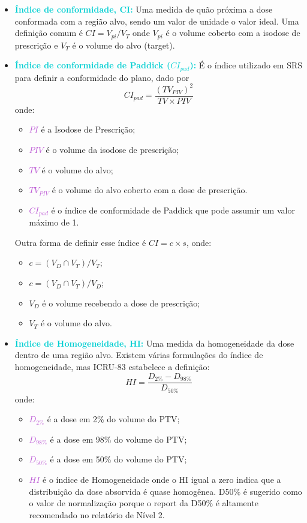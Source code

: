 \documentclass[11pt,a4paper]{article}
\begin{document}
	\begin{itemize}[label=\textcolor{CarnationPink}{$\blacktriangleright$}]
		\item \textcolor{DarkTurquoise}{\textbf{Índice de conformidade, CI:}} Uma medida de quão próxima a dose conformada com a região alvo, sendo um valor de unidade o valor ideal. Uma definição comum é $CI = V_{pi}/V_{T}$ onde $V_{pi}$ é o volume coberto com a isodose de prescrição e $V_{T}$ é o volume do alvo (target).
		\item \textcolor{DarkTurquoise}{\textbf{Índice de conformidade de Paddick ($CI_{pad}$):}} É o índice utilizado em SRS para definir a conformidade do plano, dado por $$CI_{pad} = \frac{(TV_{PIV})^2}{TV \times PIV}$$ onde:
			\begin{itemize}[label=\textcolor{CarnationPink}{$\star$}]
				\item \textcolor{MediumOrchid}{$PI$} é a Isodose de Prescrição;
				\item \textcolor{MediumOrchid}{$PIV$} é o volume da isodose de prescrição;
				\item \textcolor{MediumOrchid}{$TV$} é o volume do alvo;
				\item \textcolor{MediumOrchid}{$TV_{PIV}$} é o volume do alvo coberto com a dose de prescrição.
				\item \textcolor{MediumOrchid}{$CI_{pad}$} é o índice de conformidade de Paddick que pode assumir um valor máximo de 1. 
			\end{itemize}
		
		Outra forma de definir esse índice é $CI = c \times s$, onde:
			\begin{itemize}[label=\textcolor{CarnationPink}{$\star$}]
				\item $c = (V_D \cap V_T) / V_T$;
				\item $c = (V_D \cap V_T) / V_D$;
				\item $V_D$ é o volume recebendo a dose de prescrição;
				\item $V_T$ é o volume do alvo.
			\end{itemize}

		\item \textcolor{DarkTurquoise}{\textbf{Índice de Homogeneidade, HI:}} Uma medida da homogeneidade da dose dentro de uma região alvo. Existem várias formulações do índice de homogeneidade, mas ICRU-83 estabelece a definição: $$HI = \frac{D_{2\%} - D_{98\%}}{D_{50\%}}$$ onde:
			\begin{itemize}[label=\textcolor{CarnationPink}{$\star$}]
				\item \textcolor{MediumOrchid}{$D_{2\%}$} é a dose em 2\% do volume do PTV;
				\item \textcolor{MediumOrchid}{$D_{98\%}$} é a dose em 98\% do volume do PTV;
				\item \textcolor{MediumOrchid}{$D_{50\%}$} é a dose em 50\% do volume do PTV;
				\item \textcolor{MediumOrchid}{$HI$} é o índice de Homogeneidade onde o HI igual a zero indica que a distribuição da dose absorvida é quase homogênea. D50\% é sugerido como o valor de normalização porque o report da D50\% é altamente recomendado no relatório de Nível 2.
			\end{itemize}


\end{itemize}
\end{document}
